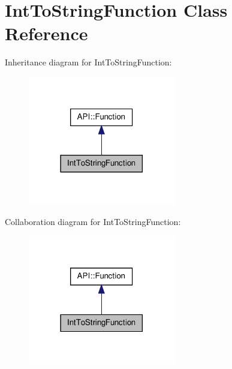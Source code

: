 \hypertarget{class_int_to_string_function}{\section{Int\-To\-String\-Function Class Reference}
\label{class_int_to_string_function}
}


Inheritance diagram for Int\-To\-String\-Function\-:\nopagebreak
\begin{figure}[H]
\begin{center}
\leavevmode
\includegraphics[width=182pt]{class_int_to_string_function__inherit__graph}
\end{center}
\end{figure}


Collaboration diagram for Int\-To\-String\-Function\-:\nopagebreak
\begin{figure}[H]
\begin{center}
\leavevmode
\includegraphics[width=182pt]{class_int_to_string_function__coll__graph}
\end{center}
\end{figure}
